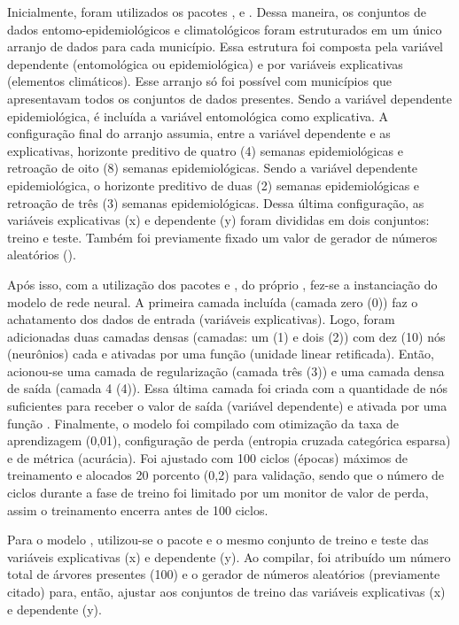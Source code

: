 \documentclass[
	12pt,				%
	openright,			%
	oneside,			%
	a4paper,			%
	english,			%
	french,				%
	spanish,			%
	brazil				%
	dvipsnames, table]{abntex2}
\begin{document}
\indent Inicialmente, foram utilizados os pacotes ,  e  \cite{scikit-learn_2011_pedregosa, sklearn_2013_buitinck}. Dessa maneira, os conjuntos de dados entomo-epidemiológicos e climatológicos foram estruturados em um único arranjo de dados para cada município. Essa estrutura foi composta pela variável dependente (entomológica ou epidemiológica) e por variáveis explicativas (elementos climáticos). Esse arranjo só foi possível com municípios que apresentavam todos os conjuntos de dados presentes. Sendo a variável dependente epidemiológica, é incluída a variável entomológica como explicativa. A configuração final do arranjo assumia, entre a variável dependente e as explicativas, horizonte preditivo de quatro (4) semanas epidemiológicas e retroação de oito (8) semanas epidemiológicas. Sendo a variável dependente epidemiológica, o horizonte preditivo de duas (2) semanas epidemiológicas e retroação de três (3) semanas epidemiológicas. Dessa última configuração, as variáveis explicativas (x) e dependente (y) foram divididas em dois conjuntos: treino e teste. Também foi previamente fixado um valor de gerador de números aleatórios ().

\indent Após isso, com a utilização dos pacotes  \cite{tensorflow_2015_whitepaper} e  \cite{keras_2015_chollet}, do próprio , fez-se a instanciação do modelo de rede neural. A primeira camada incluída (camada zero (0)) faz o achatamento dos dados de entrada (variáveis explicativas). Logo, foram adicionadas duas camadas densas (camadas: um (1) e dois (2)) com dez (10) nós (neurônios) cada e ativadas por uma função  (unidade linear retificada). Então, acionou-se uma camada de regularização (camada três (3)) e uma camada densa de saída (camada 4 (4)). Essa última camada foi criada com a quantidade de nós suficientes para receber o valor de saída (variável dependente) e ativada por uma função . Finalmente, o modelo foi compilado com otimização da taxa de aprendizagem (0,01), configuração de perda (entropia cruzada categórica esparsa) e de métrica (acurácia). Foi ajustado com 100 ciclos (épocas) máximos de treinamento e alocados 20 porcento (0,2) para validação, sendo que o número de ciclos durante a fase de treino foi limitado por um monitor de valor de perda, assim o treinamento encerra antes de 100 ciclos.

\indent Para o modelo , utilizou-se o pacote  e o mesmo conjunto de treino e teste das variáveis explicativas (x) e dependente (y). Ao compilar, foi atribuído um número total de árvores presentes (100) e o gerador de números aleatórios (previamente citado) para, então, ajustar aos conjuntos de treino das variáveis explicativas (x) e dependente (y).
\end{document}
